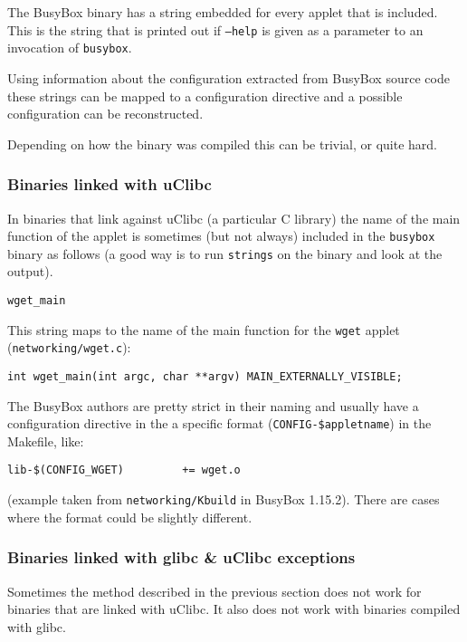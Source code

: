 \documentclass[10pt]{article}
\begin{document}
The BusyBox binary has a string embedded for every applet that is included.
This is the string that is printed out if \texttt{--help} is given as a
parameter to an invocation of \texttt{busybox}.

Using information about the configuration extracted from BusyBox source code
these strings can be mapped to a configuration directive and a possible
configuration can be reconstructed.

Depending on how the binary was compiled this can be trivial, or quite hard.

\subsubsection{Binaries linked with uClibc}

In binaries that link against uClibc (a particular C library) the name of the
main function of the applet is sometimes (but not always) included in the
\texttt{busybox} binary as follows (a good way is to run \texttt{strings} on
the binary and look at the output).

\begin{verbatim}
wget_main
\end{verbatim}

This string maps to the name of the main function for the \texttt{wget} applet
(\texttt{networking/wget.c}):

\begin{verbatim}
int wget_main(int argc, char **argv) MAIN_EXTERNALLY_VISIBLE;
\end{verbatim}

The BusyBox authors are pretty strict in their naming and usually have a
configuration directive in the a specific format
(\texttt{CONFIG-\$appletname}) in the Makefile, like:

\begin{verbatim}
lib-$(CONFIG_WGET)         += wget.o
\end{verbatim}

(example taken from \texttt{networking/Kbuild} in BusyBox 1.15.2). There are
cases where the format could be slightly different.

\subsubsection{Binaries linked with glibc \& uClibc exceptions}

Sometimes the method described in the previous section does not work for
binaries that are linked with uClibc. It also does not work with binaries
compiled with glibc.
\end{document}
